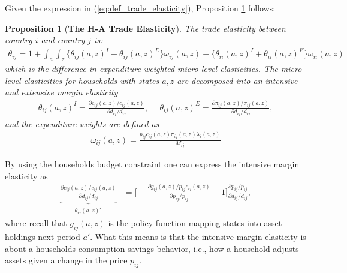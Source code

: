 \documentclass[12pt,pdftex]{article}
\newtheorem{prp}{Proposition}
\begin{document}
\begin{onehalfspacing}
Given the expression in (\ref{eq:def_trade_elasticity}), Proposition \ref{apx-prp:GET} follows:
\begin{prp}[\textbf{The H-A Trade Elasticity}] \label{apx-prp:GET} The trade elasticity between country $i$ and country $j$ is:
{\footnotesize
\begin{align}
\theta_{ij} = 1 + \int_{a}\int_{z}  \bigg \{ \theta_{ij}(a,z)^{I} + \theta_{ij}(a,z)^{E} \bigg \}\omega_{ij}(a,z) - \bigg \{ \theta_{ii}(a,z)^{I} + \theta_{ii}(a,z)^{E} \bigg \}\omega_{ii}(a,z)
\label{eq:apx-trade-elasticity}
\end{align}
}which is the difference in expenditure weighted micro-level elasticities. The micro-level elasticities for households with states $a,z$ are decomposed into an intensive and extensive margin elasticity
{\footnotesize
\begin{align}
\nonumber
\theta_{ij}(a,z)^{I} = \frac{\partial c_{ij}(a,z)/ c_{ij}(a,z)}{\partial d_{ij} / d_{ij}}, \ \ \ \ \ \ \theta_{ij}(a,z)^{E} = \frac{\partial \pi_{ij}(a,z) / \pi_{ij}(a,z)}{\partial d_{ij} / d_{ij}},
\end{align}
}
and the expenditure weights are defined as
{\footnotesize
\begin{align}
\nonumber
\omega_{ij}(a,z) = \frac{p_{ij}c_{ij}(a,z)\pi_{ij}(a,z) \lambda_{i}(a,z)}{M_{ij}}
\end{align}
}
\end{prp}
By using the households budget constraint one can express the intensive margin elasticity as
\begin{align}
\underbrace{\frac{\partial c_{ij}(a,z)/ c_{ij}(a,z)}{\partial d_{ij} / d_{ij}}}_{\theta_{ij}(a,z)^{I}} &= \bigg [-\frac{\partial g_{ij}(a,z)/ p_{ij}c_{ij}(a,z)}{\partial p_{ij}/ p_{ij}} - 1 \bigg ]\frac{\partial p_{ij}/p_{ij}}{\partial d_{ij}/ d_{ij}} ,
\label{eq:apx-intensive-margin}
\end{align}
where recall that $g_{ij}(a,z)$ is the policy function mapping states into asset holdings next period $a'$. What this means is that the intensive margin elasticity is about a households consumption-savings behavior, i.e., how a household adjusts assets given a change in the price $p_{ij}$.


\end{onehalfspacing}
\end{document}
